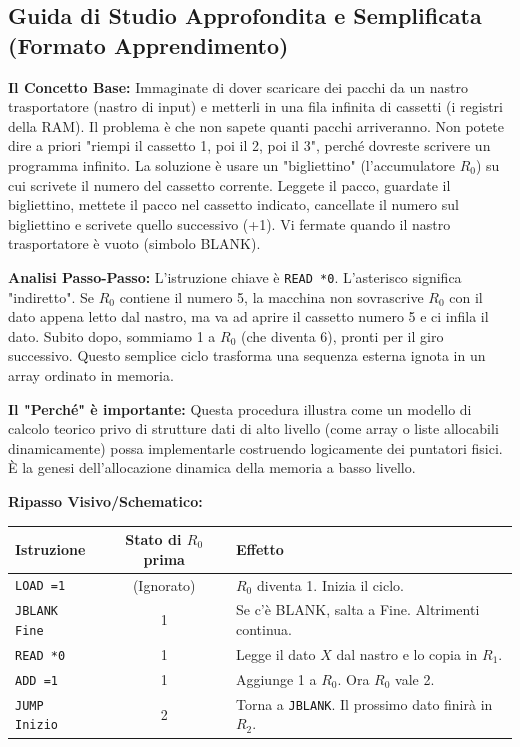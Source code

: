 \documentclass[a4paper, 11pt]{report}
\begin{document}
\vspace{0.5cm}
\subsection*{Guida di Studio Approfondita e Semplificata (Formato Apprendimento)}


\textbf{Il Concetto Base:}
Immaginate di dover scaricare dei pacchi da un nastro trasportatore (nastro di input) e metterli in una fila infinita di cassetti (i registri della RAM). Il problema è che non sapete quanti pacchi arriveranno. Non potete dire a priori "riempi il cassetto 1, poi il 2, poi il 3", perché dovreste scrivere un programma infinito. La soluzione è usare un "bigliettino" (l'accumulatore $R_0$) su cui scrivete il numero del cassetto corrente. Leggete il pacco, guardate il bigliettino, mettete il pacco nel cassetto indicato, cancellate il numero sul bigliettino e scrivete quello successivo (+1). Vi fermate quando il nastro trasportatore è vuoto (simbolo BLANK).

\textbf{Analisi Passo-Passo:}
L'istruzione chiave è \texttt{READ *0}. L'asterisco significa "indiretto". Se $R_0$ contiene il numero 5, la macchina non sovrascrive $R_0$ con il dato appena letto dal nastro, ma va ad aprire il cassetto numero 5 e ci infila il dato. Subito dopo, sommiamo 1 a $R_0$ (che diventa 6), pronti per il giro successivo. Questo semplice ciclo trasforma una sequenza esterna ignota in un array ordinato in memoria.

\textbf{Il "Perché" è importante:}
Questa procedura illustra come un modello di calcolo teorico privo di strutture dati di alto livello (come array o liste allocabili dinamicamente) possa implementarle costruendo logicamente dei puntatori fisici. È la genesi dell'allocazione dinamica della memoria a basso livello.

\textbf{Ripasso Visivo/Schematico:}
\begin{center}
\begin{tabular}{|l|c|p{7cm}|}
\hline
\textbf{Istruzione} & \textbf{Stato di $R_0$ prima} & \textbf{Effetto} \\
\hline
\texttt{LOAD =1} & (Ignorato) & $R_0$ diventa 1. Inizia il ciclo. \\
\hline
\texttt{JBLANK Fine} & 1 & Se c'è BLANK, salta a Fine. Altrimenti continua. \\
\hline
\texttt{READ *0} & 1 & Legge il dato $X$ dal nastro e lo copia in $R_1$. \\
\hline
\texttt{ADD =1} & 1 & Aggiunge 1 a $R_0$. Ora $R_0$ vale 2. \\
\hline
\texttt{JUMP Inizio} & 2 & Torna a \texttt{JBLANK}. Il prossimo dato finirà in $R_2$. \\
\hline
\end{tabular}
\end{center}
\end{document}
